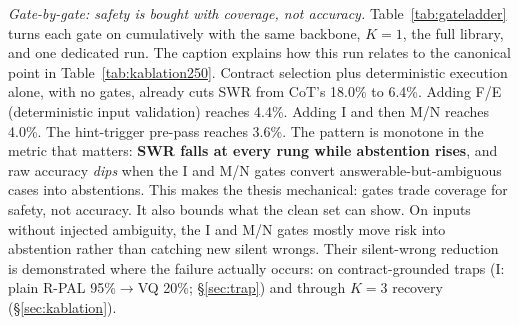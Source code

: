 \emph{Gate-by-gate: safety is bought with coverage, not accuracy.}
Table~\ref{tab:gateladder} turns each gate on cumulatively with the same backbone, $K{=}1$, the full library, and one dedicated run.
The caption explains how this run relates to the canonical point in Table~\ref{tab:kablation250}.
Contract selection plus deterministic execution alone, with no gates, already cuts SWR from CoT's 18.0\% to 6.4\%.
Adding F/E (deterministic input validation) reaches 4.4\%.
Adding I and then M/N reaches 4.0\%.
The hint-trigger pre-pass reaches 3.6\%.
The pattern is monotone in the metric that matters: \textbf{SWR falls at every rung while abstention rises}, and raw accuracy \emph{dips} when the I and M/N gates convert answerable-but-ambiguous cases into abstentions.
This makes the thesis mechanical: gates trade coverage for safety, not accuracy.
It also bounds what the clean set can show.
On inputs without injected ambiguity, the I and M/N gates mostly move risk into abstention rather than catching new silent wrongs.
Their silent-wrong reduction is demonstrated where the failure actually occurs: on contract-grounded traps (I: plain R-PAL 95\%$\rightarrow$VQ 20\%; \S\ref{sec:trap}) and through $K{=}3$ recovery (\S\ref{sec:kablation}).

